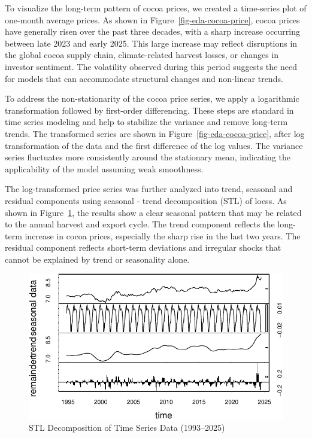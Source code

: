\documentclass[
  letterpaper,
  DIV=11,
  numbers=noendperiod]{scrartcl}
\begin{document}
To visualize the long-term pattern of cocoa prices, we created a
time-series plot of one-month average prices. As shown in
Figure~\ref{fig-eda-cocoa-price}, cocoa prices have generally risen over
the past three decades, with a sharp increase occurring between late
2023 and early 2025. This large increase may reflect disruptions in the
global cocoa supply chain, climate-related harvest losses, or changes in
investor sentiment. The volatility observed during this period suggests
the need for models that can accommodate structural changes and
non-linear trends.

To address the non-stationarity of the cocoa price series, we apply a
logarithmic transformation followed by first-order differencing. These
steps are standard in time series modeling and help to stabilize the
variance and remove long-term trends. The transformed series are shown
in Figure~\ref{fig-eda-cocoa-price}, after log transformation of the
data and the first difference of the log values. The variance series
fluctuates more consistently around the stationary mean, indicating the
applicability of the model assuming weak smoothness.

The log-transformed price series was further analyzed into trend,
seasonal and residual components using seasonal - trend decomposition
(STL) of loess. As shown in
Figure~\ref{fig-exploratory-data-analysis-2}, the results show a clear
seasonal pattern that may be related to the annual harvest and export
cycle. The trend component reflects the long-term increase in cocoa
prices, especially the sharp rise in the last two years. The residual
component reflects short-term deviations and irregular shocks that
cannot be explained by trend or seasonality alone.

\begin{figure}

{\centering \includegraphics{STA457_Project_files/figure-pdf/fig-exploratory-data-analysis-2-1.pdf}

}

\caption{\label{fig-exploratory-data-analysis-2}STL Decomposition of
Time Series Data (1993--2025)}

\end{figure}
\end{document}
